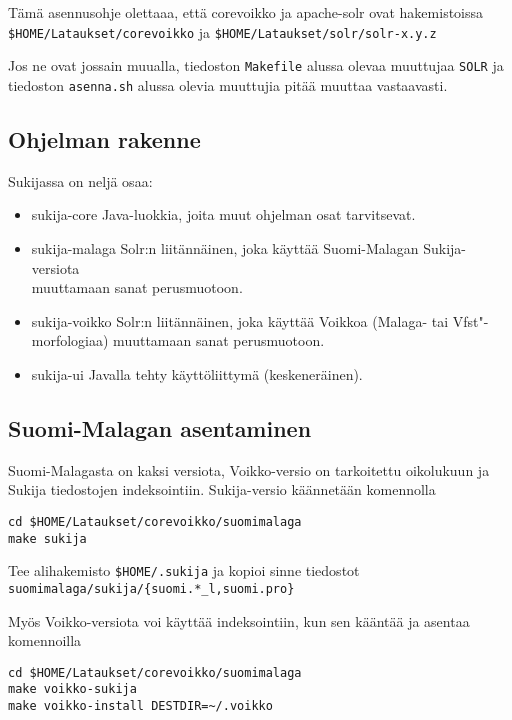 \documentclass[12pt,a4paper]{scrartcl}
\begin{document}
Tämä asennusohje olettaaa, että corevoikko ja apache-solr ovat hakemistoissa \\
\verb=$HOME/Lataukset/corevoikko= ja
\verb=$HOME/Lataukset/solr/solr-x.y.z=

Jos ne ovat jossain muualla, tiedoston \verb=Makefile= alussa olevaa
muuttujaa \verb=SOLR= ja tiedoston \verb=asenna.sh= alussa olevia
muuttujia pitää muuttaa vastaavasti.

\newpage
\subsection*{Ohjelman rakenne}

Sukijassa on neljä osaa:

\begin{itemize}
\item sukija-core     Java-luokkia, joita muut ohjelman osat tarvitsevat.
\item sukija-malaga   Solr:n liitännäinen, joka käyttää Suomi-Malagan
                      Sukija-versiota \\muuttamaan sanat perusmuotoon.
\item sukija-voikko   Solr:n liitännäinen, joka käyttää Voikkoa
                      (Malaga- tai Vfst"-morfologiaa) muuttamaan sanat perusmuotoon.
\item sukija-ui       Javalla tehty käyttöliittymä (keskeneräinen).
\end{itemize}


\subsection*{Suomi-Malagan asentaminen}

Suomi-Malagasta on kaksi versiota, Voikko-versio on tarkoitettu
oikolukuun ja Sukija tiedostojen indeksointiin. Sukija-versio
käännetään komennolla

\begin{verbatim}
cd $HOME/Lataukset/corevoikko/suomimalaga
make sukija
\end{verbatim}

Tee alihakemisto \verb=$HOME/.sukija= ja kopioi sinne tiedostot \\
\verb=suomimalaga/sukija/{suomi.*_l,suomi.pro}=

Myös Voikko-versiota voi käyttää indeksointiin, kun sen kääntää ja
asentaa komennoilla

\begin{verbatim}
cd $HOME/Lataukset/corevoikko/suomimalaga
make voikko-sukija
make voikko-install DESTDIR=~/.voikko
\end{verbatim}
\end{document}
